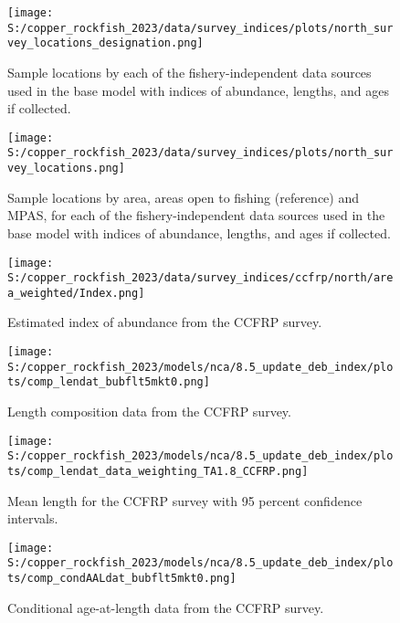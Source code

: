 \documentclass[11pt,
  english,
  letterpaper,
]{article}
\begin{document}
\begin{figure}
\centering
\texttt{[image: S:/copper\_rockfish\_2023/data/survey\_indices/plots/north\_survey\_locations\_designation.png]}
\caption{Sample locations by each of the fishery-independent data sources used in the base model with indices of abundance, lengths, and ages if collected.\label{fig:survey-locations}}
\end{figure}

\begin{figure}
\centering
\texttt{[image: S:/copper\_rockfish\_2023/data/survey\_indices/plots/north\_survey\_locations.png]}
\caption{Sample locations by area, areas open to fishing (reference) and MPAS, for each of the fishery-independent data sources used in the base model with indices of abundance, lengths, and ages if collected.\label{fig:ref-mpa}}
\end{figure}

\begin{figure}
\centering
\texttt{[image: S:/copper\_rockfish\_2023/data/survey\_indices/ccfrp/north/area\_weighted/Index.png]}
\caption{Estimated index of abundance from the CCFRP survey.\label{fig:ccfrp-index-main}}
\end{figure}

\begin{figure}
\centering
\texttt{[image: S:/copper\_rockfish\_2023/models/nca/8.5\_update\_deb\_index/plots/comp\_lendat\_bubflt5mkt0.png]}
\caption{Length composition data from the CCFRP survey.\label{fig:ccfrp-len-data}}
\end{figure}

\begin{figure}
\centering
\texttt{[image: S:/copper\_rockfish\_2023/models/nca/8.5\_update\_deb\_index/plots/comp\_lendat\_data\_weighting\_TA1.8\_CCFRP.png]}
\caption{Mean length for the CCFRP survey with 95 percent confidence intervals.\label{fig:ccfrp-mean-len-data}}
\end{figure}

\begin{figure}
\centering
\texttt{[image: S:/copper\_rockfish\_2023/models/nca/8.5\_update\_deb\_index/plots/comp\_condAALdat\_bubflt5mkt0.png]}
\caption{Conditional age-at-length data from the CCFRP survey.\label{fig:ccfrp-age-data}}
\end{figure}
\end{document}
